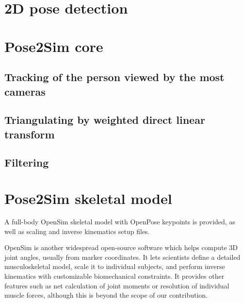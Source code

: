 \section{2D pose detection}



\section{Pose2Sim core}
\subsection{Tracking of the person viewed by the most cameras}
\blindtext

\subsection{Triangulating by weighted direct linear transform}



\subsection{Filtering}
\blindtext


\section{Pose2Sim skeletal model}

A full-body OpenSim \cite{Delp2007,Seth2018} skeletal model with OpenPose keypoints is provided, as well as scaling and inverse kinematics setup files.

OpenSim is another widespread open-source software which helps compute 3D joint angles, usually from marker coordinates. It lets scientists define a detailed musculoskeletal model, scale it to individual subjects, and perform inverse kinematics with customizable biomechanical constraints. It provides other features such as net calculation of joint moments or resolution of individual muscle forces, although this is beyond the scope of our contribution.


